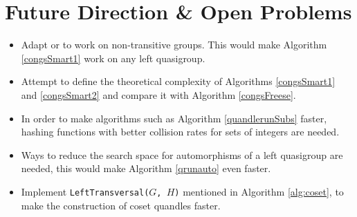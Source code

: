 \documentclass{mcom-l}
\begin{document}
\section{Future Direction \& Open Problems}
\begin{itemize}
    \item Adapt \cite{atkinson} or \cite{schonert1994finding} to work on non-transitive groups. This would make Algorithm \ref{congsSmart1} work on any left quasigroup.
    \item Attempt to define the theoretical complexity of Algorithms \ref{congsSmart1} and \ref{congsSmart2} and compare it with Algorithm \ref{congsFreese}.
    \item In order to make algorithms such as Algorithm \ref{quandlerunSubs} faster, hashing functions with better collision rates for sets of integers are needed. 
    \item Ways to reduce the search space for automorphisms of a left quasigroup are needed, this would make Algorithm \ref{qrunauto} even faster.
    \item Implement \texttt{LeftTransversal($G$, $H$)} mentioned in Algorithm \ref{alg:coset}, to make the construction of coset quandles faster. 
\end{itemize}




\end{document}
